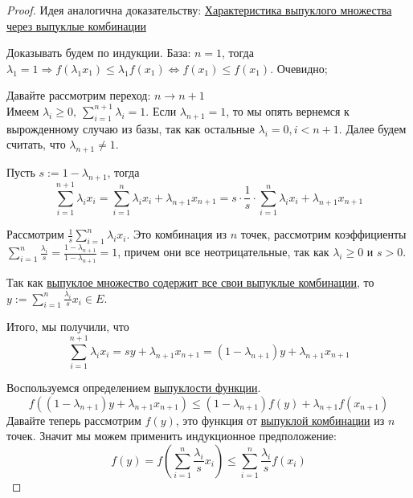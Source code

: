 

\begin{proof}
  Идея аналогична доказательству: \hyperref[note:42DFF6DC-CC9D-40AA-9D6F-218DCF613833]{Характеристика выпуклого множества через выпуклые комбинации}

  Доказывать будем по индукции.
  База: $n=1$,  тогда $\lambda_1 = 1 \Rightarrow f(\lambda_1 x_1) \le \lambda_1 f(x_1) \Leftrightarrow f(x_1) \le f(x_1)$. Очевидно;

  Давайте рассмотрим переход: $n \rightarrow n+1$ \\
  Имеем $\lambda_i \ge 0,\ \sum\limits_{i=1}^{n+1} \lambda_i = 1$. Если $\lambda_{n+1} = 1$, то мы опять вернемся к вырожденному случаю из базы,
  так как остальные $\lambda_i = 0, i < n+1$. Далее будем считать, что $\lambda_{n+1} \ne 1$.

  Пусть $s:= 1 - \lambda_{n+1}$, тогда
  \[
  \sum\limits_{i=1}^{n+1} \lambda_i x_i = \sum\limits_{i=1}^n \lambda_i x_i + \lambda_{n+1} x_{n+1} =
  s \cdot \frac{1}{s} \cdot \sum\limits_{i=1}^n \lambda_i x_i + \lambda_{n+1} x_{n+1}
  \]

  Рассмотрим $\frac{1}{s} \sum\limits_{i=1}^n \lambda_i x_i$. Это комбинация из $n$ точек, рассмотрим коэффициенты
  $\sum\limits_{i=1}^n \frac{\lambda_i}{s} = \frac{1-\lambda_{n+1}}{1-\lambda_{n+1}} = 1$, причем они все неотрицательные, так как $\lambda_i \ge 0$ и $s > 0$.

  Так как \hyperref[note:42DFF6DC-CC9D-40AA-9D6F-218DCF613833]{выпуклое множество содержит все свои выпуклые комбинации}, то $y := \sum\limits_{i=1}^n \frac{\lambda_i}{s} x_i \in E$.

  Итого, мы получили, что
  \[
  \sum\limits_{i=1}^{n+1} \lambda_i x_i = s y + \lambda_{n+1}x_{n+1} = (1-\lambda_{n+1}) y + \lambda_{n+1}x_{n+1}
  \]

  Воспользуемся определением \hyperref[note:1CA14F2C-637F-41DE-9E97-72075D19E97F]{выпуклости функции}.
  \[
  f( (1 - \lambda_{n+1})y + \lambda_{n+1} x_{n+1} ) \le (1-\lambda_{n+1}) f(y) + \lambda_{n+1} f(x_{n+1})
  \]
  Давайте теперь рассмотрим $f(y)$, это функция от \hyperref[note:8583F986-A6E8-4BBB-B2FB-BA0E9BBE58BF]{выпуклой комбинации} из $n$ точек.
  Значит мы можем применить индукционное предположение:
  \[
  f(y) = f \left(  \sum\limits_{i=1}^n \frac{\lambda_i}{s} x_i \right) \le \sum\limits_{i=1}^n \frac{\lambda_i}{s} f(x_i)
  \]


\end{proof}
